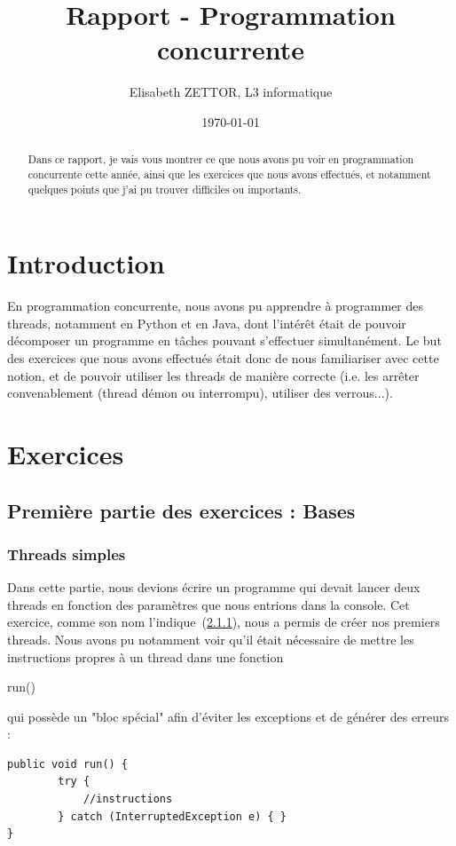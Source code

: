 \documentclass{article}
\title{Rapport - Programmation concurrente}
\author{Elisabeth ZETTOR, L3 informatique}
\date{\today}
\begin{document}
\maketitle %


\begin{abstract}
  Dans ce rapport, je vais vous montrer ce que nous avons pu voir en programmation concurrente cette année, ainsi que les exercices que nous avons effectués, et notamment quelques points que j'ai pu trouver difficiles ou importants.
\end{abstract}

\section{Introduction}
\label{section : intro}

\begin{center}

\end{center}
En programmation concurrente, nous avons pu apprendre à programmer des threads, notamment en Python et en Java, dont l'intérêt était de pouvoir décomposer un programme en tâches pouvant s'effectuer simultanément. Le but des exercices que nous avons effectués était donc de nous familiariser avec cette notion, et de pouvoir utiliser les threads de manière correcte (i.e. les arrêter convenablement (thread démon ou interrompu), utiliser des verrous...).

\section{Exercices}
\label{section : exercices}

\subsection{Première partie des exercices : Bases}
\label{section : base}


\subsubsection{Threads simples}
\label{section : threadsimples}

Dans cette partie, nous devions écrire un programme qui devait lancer deux threads en fonction des paramètres que nous entrions dans la console. Cet exercice, comme son nom l'indique~(\ref{section : threadsimples}), nous a permis de créer nos premiers threads. Nous avons pu notamment voir qu'il était nécessaire de mettre les instructions propres à un thread dans une fonction \begin{it}run()\end{it} qui possède un "bloc spécial" afin d'éviter les exceptions et de générer des erreurs : 
\begin{verbatim}
public void run() {
		try {
			//instructions
		} catch (InterruptedException e) { }
}
\end{verbatim}
\end{document}
